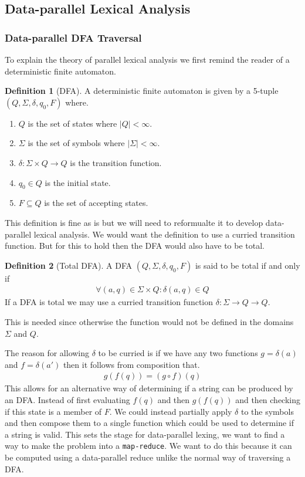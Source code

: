 \documentclass[a4paper,12pt]{article}
\theoremstyle{definition}
\newtheorem{definition}{Definition}[section]
\begin{document}
\subsection{Data-parallel Lexical Analysis}
\subsubsection{Data-parallel DFA Traversal}
To explain the theory of parallel lexical analysis we first remind the reader of a deterministic finite automaton.
\begin{definition}[DFA]
  A deterministic finite automaton \cite{10.5555/1196416} \cite{enwiki:1192025610} is given by a 5-tuple $(Q, \Sigma, \delta, q_0, F)$ where.
  \begin{enumerate}
    \item $Q$ is the set of states where $|Q| < \infty$.
    \item $\Sigma$ is the set of symbols where $|\Sigma| < \infty$.
    \item $\delta: \Sigma \times Q \to Q$ is the transition function.
    \item $q_0 \in Q$ is the initial state.
    \item $F\subseteq Q$ is the set of accepting states.
  \end{enumerate}
\end{definition}
\noindent This definition is fine as is but we will need to reformualte it to develop data-parallel lexical analysis. We would want the definition to use a curried transition function. But for this to hold then the DFA would also have to be total.
\begin{definition}[Total DFA]
  A DFA $(Q, \Sigma, \delta, q_0, F)$ is said to be total if and only if
  \begin{align*}
    \forall (a, q) \in \Sigma \times Q: \delta(a, q) \in Q 
  \end{align*}
  If a DFA is total we may use a curried transition function $\delta: \Sigma \to Q \to Q$.
\end{definition}
\noindent This is needed since otherwise the function would not be defined in the domains $\Sigma$ and $Q$.

The reason for allowing $\delta$ to be curried is if we have any two functions $g = \delta(a)$ and $f = \delta(a')$ then it follows from composition that.
\begin{align*}
  g(f(q)) = (g \circ f) (q)
\end{align*}
This allows for an alternative way of determining if a string can be produced by an DFA. Instead of first evaluating $f(q)$ and then $g(f(q))$ and then checking if this state is a member of $F$. We could instead partially apply $\delta$ to the symbols and then compose them to a single function which could be used to determine if a string is valid. This sets the stage for data-parallel lexing, we want to find a way to make the problem into a \texttt{map-reduce}. We want to do this because it can be computed using a data-parallel reduce unlike the normal way of traversing a DFA.
\end{document}
